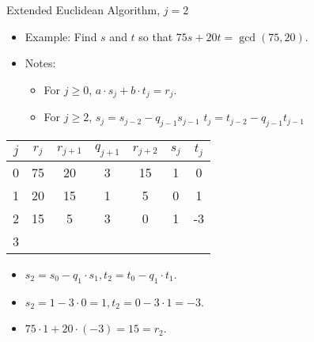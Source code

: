 \documentclass{beamer}
\begin{document}
\begin{frame}{Extended Euclidean Algorithm, $j=2$}

\begin{itemize}
  \item Example: Find $s$ and $t$ so that $75s+20t = \gcd(75, 20)$.
  \item Notes:
  \begin{itemize}
    \item For $j\geq0$, $a \cdot s_j + b \cdot t_j = r_j$.
    \item For $j\geq 2$, $s_j=s_{j-2} - q_{j-1}s_{j-1}$ \quad $t_j=t_{j-2} - q_{j-1}t_{j-1}$
  \end{itemize}
\end{itemize}

\vspace{1em}

\begin{tabular}{|c|c|c|c|c|c|c|}\hline
$j$   &  $r_{j}$    & $r_{j+1}$ & $q_{j+1}$ & $r_{j+2}$ & $s_j$ & $t_j$ \\ \hline\hline
0     &  75         &  20       &    3      &   15      &  1    &   0   \\ \hline
1     &  20         &  15       &    1      &    5      &  0    &   1   \\ \hline
2     &  15         &   5       &    3      &    0      &  1    &  -3   \\ \hline
3     &             &           &           &           &       &       \\ \hline
\end{tabular}

\vspace{1em}

\begin{itemize}
  \item $s_2 = s_0 - q_1 \cdot s_1, t_2 = t_0 - q_1 \cdot t_1$.
  \item $s_2 =1 - 3 \cdot 0 = 1, t_2 = 0 - 3 \cdot 1 = -3$.
  \item $75\cdot 1 + 20 \cdot (-3) = 15 = r_2$.
\end{itemize}

\end{frame}
\end{document}
